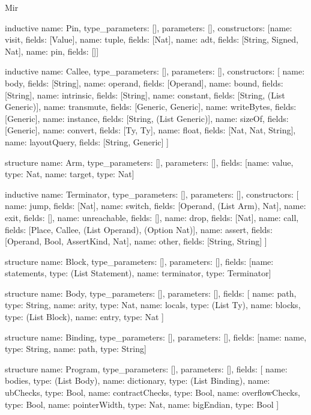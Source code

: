 \begin{lexlean}{Mir}
\begin{semanticmodule}
inductive{
  name: Pin,
  type_parameters: [],
  parameters: [],
  constructors: [{name: visit, fields: [Value]}, {name: tuple, fields: [Nat]}, {name: adt, fields: [String, Signed, Nat]}, {name: pin, fields: []}]
}

inductive{
  name: Callee,
  type_parameters: [],
  parameters: [],
  constructors: [
    {name: body, fields: [String]},
    {name: operand, fields: [Operand]},
    {name: bound, fields: [String]},
    {name: intrinsic, fields: [String]},
    {name: constant, fields: [String, (List Generic)]},
    {name: transmute, fields: [Generic, Generic]},
    {name: writeBytes, fields: [Generic]},
    {name: instance, fields: [String, (List Generic)]},
    {name: sizeOf, fields: [Generic]},
    {name: convert, fields: [Ty, Ty]},
    {name: float, fields: [Nat, Nat, String]},
    {name: layoutQuery, fields: [String, Generic]}
  ]
}

structure{
  name: Arm,
  type_parameters: [],
  parameters: [],
  fields: [{name: value, type: Nat}, {name: target, type: Nat}]
}

inductive{
  name: Terminator,
  type_parameters: [],
  parameters: [],
  constructors: [
    {name: jump, fields: [Nat]},
    {name: switch, fields: [Operand, (List Arm), Nat]},
    {name: exit, fields: []},
    {name: unreachable, fields: []},
    {name: drop, fields: [Nat]},
    {name: call, fields: [Place, Callee, (List Operand), (Option Nat)]},
    {name: assert, fields: [Operand, Bool, AssertKind, Nat]},
    {name: other, fields: [String, String]}
  ]
}

structure{
  name: Block,
  type_parameters: [],
  parameters: [],
  fields: [{name: statements, type: (List Statement)}, {name: terminator, type: Terminator}]
}

structure{
  name: Body,
  type_parameters: [],
  parameters: [],
  fields: [
    {name: path, type: String},
    {name: arity, type: Nat},
    {name: locals, type: (List Ty)},
    {name: blocks, type: (List Block)},
    {name: entry, type: Nat}
  ]
}

structure{
  name: Binding,
  type_parameters: [],
  parameters: [],
  fields: [{name: name, type: String}, {name: path, type: String}]
}

structure{
  name: Program,
  type_parameters: [],
  parameters: [],
  fields: [
    {name: bodies, type: (List Body)},
    {name: dictionary, type: (List Binding)},
    {name: ubChecks, type: Bool},
    {name: contractChecks, type: Bool},
    {name: overflowChecks, type: Bool},
    {name: pointerWidth, type: Nat},
    {name: bigEndian, type: Bool}
  ]
}


\end{semanticmodule}
\end{lexlean}
